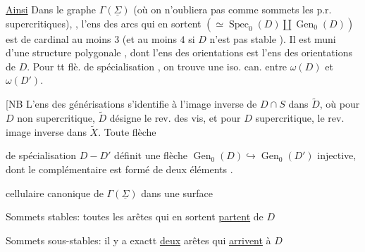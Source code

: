 \uline{Ainsi} Dans le graphe  $\Gamma(\underline\Sigma)$ (où on n'oubliera pas comme sommets les p.r. supercritiques), , l'ens des  arcs qui en sortent $(\simeq\operatorname{Spec}_0(D)\amalg\operatorname{Gen}_0(D))$ est de cardinal au moins $3$ (et au moins $4$ si $D$ n'est pas stable ). Il est muni d'une structure polygonale , dont l'ens des orientations est  l'ens des orientations de $D$. Pour tt flè. de spécialisation , on trouve une iso. can. entre $\omega(D)$ et $\omega(D')$.

[NB L'ens des générisations   s'identifie à l'image  inverse de $D\cap S$ dans $\widetilde D$, où pour $D$ non supercritique, $\widetilde D$ désigne le rev. des vis, et pour $D$ supercritique, le rev. image inverse dans $\widetilde X$. Toute flèche



de spécialisation $D\mathbin{-}D'$ définit une flèche $\operatorname{Gen}_0(D)\hookrightarrow\operatorname{Gen}_0(D')$ injective, dont le complémentaire est formé de deux  éléments .

 cellulaire canonique de $\Gamma(\underline\Sigma)$ dans une surface 

Sommets stables: toutes les arêtes qui en sortent \uline{partent} de $D$

Sommets sous-stables: il y a exactt \uline{deux} arêtes qui \uline{arrivent} à $D$


